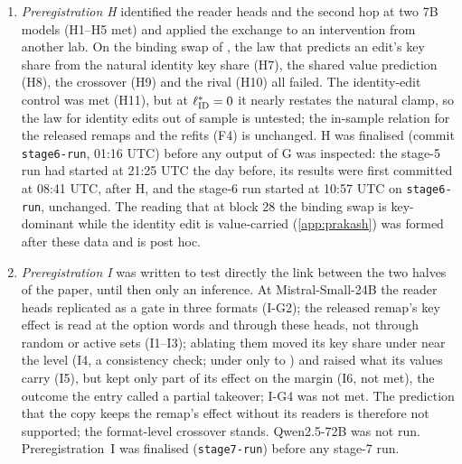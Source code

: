 \begin{enumerate}
  \item \emph{Preregistration H} identified the reader heads and the second hop at two 7B models (H1--H5 met) and applied the exchange to an intervention from another lab. On the binding swap of \citet{prakash2025lookbacks}, the law that predicts an edit's key share from the natural identity key share (H7), the shared value prediction (H8), the crossover (H9) and the rival (H10) all failed. The identity-edit control was met (H11), but at $\ell^*_{\mathrm{ID}} = 0{}$ it nearly restates the natural clamp, so the law for identity edits out of sample is untested; the in-sample relation for the released remaps and the refits (F4) is unchanged. H was finalised (commit \texttt{stage6-run}, 01:16 UTC) before any output of G was inspected: the stage-5 run had started at 21:25 UTC the day before, its results were first committed at 08:41 UTC, after H, and the stage-6 run started at 10:57 UTC on \texttt{stage6-run}, unchanged. The reading that at block 28 the binding swap is key-dominant while the identity edit is value-carried (\cref{app:prakash}) was formed after these data and is post hoc.
  \item \emph{Preregistration I} was written to test directly the link between the two halves of the paper, until then only an inference. At Mistral-Small-24B the reader heads replicated as a gate in three formats (I-G2); the released remap's key effect is read at the option words and through these heads, not through random or active sets (I1--I3); ablating them moved its key share under \fmtOpt{} near the \fmtNone{} level (I4, a consistency check; under \fmtLetter{} only to \IfourKappaALetter{}) and raised what its values carry (I5), but kept only part of its effect on the margin (I6, not met), the outcome the entry called a partial takeover; I-G4 was not met. The prediction that the copy keeps the remap's effect without its readers is therefore not supported; the format-level crossover stands. Qwen2.5-72B was not run. Preregistration~I was finalised (\texttt{stage7-run}) before any stage-7 run.

\end{enumerate}
